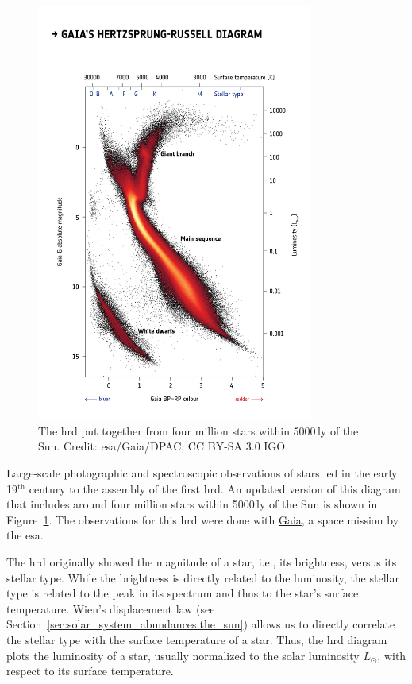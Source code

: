 \begin{figure}[p]
    \centering
    \includegraphics[width=0.81\textwidth]{graphics/sun/gaia_hrd}
    \caption{The \acl{hrd} put together from four million stars within 5000\,ly of the Sun. Credit: \acs{esa}/Gaia/DPAC, CC BY-SA 3.0 IGO.}
\label{fig:sun:hrd_gaia}
\end{figure}

Large-scale photographic and spectroscopic observations of stars led in the early 19$^\mathrm{th}$ century to the assembly of the first \ac{hrd}. An updated version of this diagram that includes around four million stars within 5000\,ly of the Sun is shown in Figure~\ref{fig:sun:hrd_gaia}. The observations for this \ac{hrd} were done with \href{https://sci.esa.int/web/gaia}{Gaia}, a space mission by the \ac{esa}. 

The \ac{hrd} originally showed the magnitude of a star, i.e., its brightness, versus its stellar type. While the brightness is directly related to the luminosity, the stellar type is related to the peak in its spectrum and thus to the star's surface temperature. Wien's displacement law (see Section~\ref{sec:solar_system_abundances:the_sun}) allows us to directly correlate the stellar type with the surface temperature of a star. Thus, the \ac{hrd} diagram plots the luminosity of a star, usually normalized to the solar luminosity $L_\odot$, with respect to its surface temperature.

